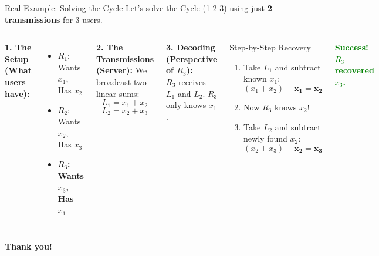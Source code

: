\documentclass[aspectratio=169,xcolor=dvipsnames]{beamer}
\begin{document}
	\begin{frame}{Real Example: Solving the Cycle}
		Let's solve the Cycle (1-2-3) using just \textbf{2 transmissions} for 3 users.
		
		\begin{columns}[t]
			\textbf{1. The Setup (What users have):}
			\begin{itemize}
				\item $R_1$: Wants $x_1$, Has $x_2$
				\item $R_2$: Wants $x_2$, Has $x_3$
				\item \textbf{$R_3$: Wants $x_3$, Has $x_1$}
			\end{itemize}
			
			\vspace{1em}
			\textbf{2. The Transmissions (Server):}
			We broadcast two linear sums:
			$$ L_1 = x_1 + x_2 $$
			$$ L_2 = x_2 + x_3 $$
			
			\textbf{3. Decoding (Perspective of $R_3$):}
			\\ \small{$R_3$ receives $L_1$ and $L_2$. $R_3$ only knows $x_1$.}
			
			\vspace{0.5em}
			\begin{block}{Step-by-Step Recovery}
				\begin{enumerate}
					\item Take $L_1$ and subtract known $x_1$:
					$$ (x_1 + x_2) - \mathbf{x_1} = \mathbf{x_2} $$
					\item Now $R_3$ knows $x_2$!
					\item Take $L_2$ and subtract newly found $x_2$:
					$$ (x_2 + x_3) - \mathbf{x_2} = \mathbf{x_3} $$
				\end{enumerate}
			\end{block}
			\vspace{0.2em}
			\centering \textcolor{green}{\textbf{Success! $R_3$ recovered $x_3$.}}
		\end{columns}
	\end{frame}
	
	\begin{frame}
		\Huge{\centerline{\textbf{Thank you!}}}
	\end{frame}
	
\end{document}
